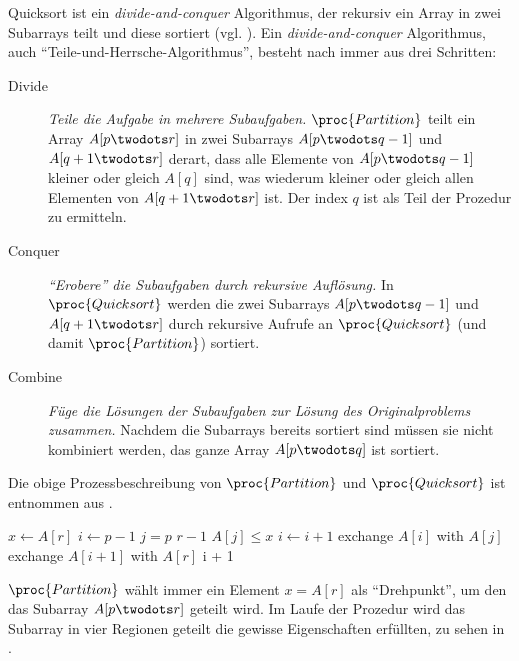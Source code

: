 Quicksort ist ein \emph{divide-and-conquer} Algorithmus, der rekursiv ein Array in zwei Subarrays teilt und diese sortiert (vgl. \cite[113f]{taocp3}). Ein \emph{divide-and-conquer} Algorithmus, auch \enquote{Teile-und-Herrsche-Algorithmus}, besteht nach \cite[65]{clrs2001} immer aus drei Schritten:
\begin{description}
    \item[Divide] \emph{Teile die Aufgabe in mehrere Subaufgaben.} $\proc{Partition}$ teilt ein Array $A[p \twodots r]$ in zwei Subarrays $A[p \twodots q-1]$ und $A[q + 1 \twodots r]$  derart, dass alle Elemente von $A[p \twodots q-1]$ kleiner oder gleich $A[q]$ sind, was wiederum kleiner oder gleich allen Elementen von $A[q + 1 \twodots r]$ ist. Der index $q$ ist als Teil der Prozedur zu ermitteln.

    \item[Conquer] \emph{\enquote{Erobere} die Subaufgaben durch rekursive Auflösung.} In $\proc{Quicksort}$ werden die zwei Subarrays $A[p \twodots q-1]$ und $A[q + 1 \twodots r]$ durch rekursive Aufrufe an $\proc{Quicksort}$ (und damit $\proc{Partition}$) sortiert.

    \item[Combine] \emph{Füge die Lösungen der Subaufgaben zur Lösung des Originalproblems zusammen.} Nachdem die Subarrays bereits sortiert sind müssen sie nicht kombiniert werden, das ganze Array $A[p \twodots q]$ ist sortiert.
\end{description}

Die obige Prozessbeschreibung von $\proc{Partition}$ und $\proc{Quicksort}$ ist entnommen aus \cite[170]{clrs2001}.

\begin{codebox}
    \li $x \gets A[r]$
    \li $i \gets p - 1$
    \li \For $j = p$ \To $r - 1$
    \li     \Do
                \If $A[j] \leq x$
    \li             \Then
                        $i \gets i + 1$
    \li                 exchange $A[i]$ with $A[j]$
                    \End
            \End
    \li exchange $A[i + 1]$ with $A[r]$
    \li \Return i + 1
\end{codebox}

$\proc{Partition}$ wählt immer ein Element $x = A[r]$ als \enquote{Drehpunkt}, um den das Subarray $A[p \twodots r]$ geteilt wird. Im Laufe der Prozedur wird das Subarray in vier Regionen geteilt die gewisse Eigenschaften erfüllten, zu sehen in .



